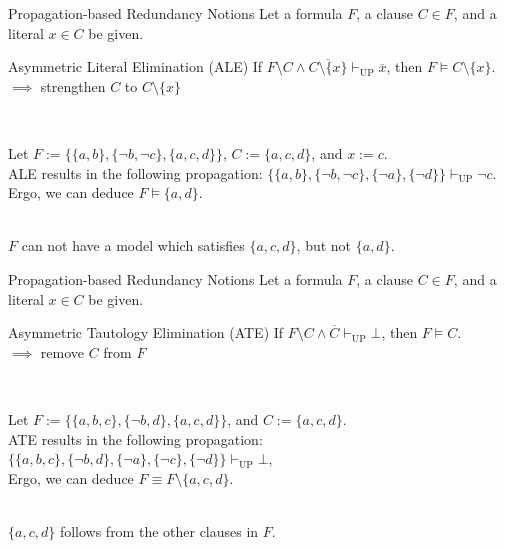 \documentclass[t]{sdqbeamer}
\begin{document}
\begin{frame}{Propagation-based Redundancy Notions}
Let a formula $F$, a clause $C \in F$, and a literal $x \in C$ be given.~\\[1ex]
\begin{block}{Asymmetric Literal Elimination (ALE)}
If $F \setminus C \land \overline{C \setminus \{ x \}} \vdash_{\mathop{UP}} \overline x$, then $F \models C \setminus \{ x \}$.\\[1ex]
$\implies$ strengthen $C$ to $C \setminus \{ x \}$
\end{block}~\\
%
\begin{example}
Let $F := \bigl\{ \{a, b\}, \{\lnot b, \lnot c\}, \{a, c, d\} \bigr\}$, $C := \{a, c, d\}$, and $x := c$.\\[1ex]
ALE results in the following propagation: $\bigl\{ \{a, b\}, \{\lnot b, \lnot c\}, \{\lnot a \}, \{\lnot d\} \bigr\} \vdash_{\mathop{UP}} \lnot c$.\\[1ex]
Ergo, we can deduce $F \models \{a, d\}$.
\end{example}~\\
$F$ can not have a model which satisfies $\{a, c, d\}$, but not $\{a, d\}$.
\end{frame}
    

\begin{frame}{Propagation-based Redundancy Notions}
Let a formula $F$, a clause $C \in F$, and a literal $x \in C$ be given.\\[1ex]
\begin{block}{Asymmetric Tautology Elimination (ATE)}
If $F \setminus C \land \overline C \vdash_{\mathop{UP}} \bot$, then $F \models C$.\\[1ex]
$\implies$ remove $C$ from $F$
\end{block}~\\
%
\begin{example}
Let $F := \bigl\{ \{a, b, c\}, \{\lnot b, d\}, \{a, c, d\} \bigr\}$, and $C := \{a, c, d\}$.\\[1ex]
ATE results in the following propagation: $\bigl\{ \{a, b, c\}, \{\lnot b, d\}, \{\lnot a\}, \{\lnot c\}, \{\lnot d\} \bigr\} \vdash_{\mathop{UP}} \bot$,\\[1ex]
Ergo, we can deduce $F \equiv F \setminus \{a,c,d\}$.
\end{example}~\\
$\{a,c,d\}$ follows from the other clauses in $F$.
\end{frame}
\end{document}
